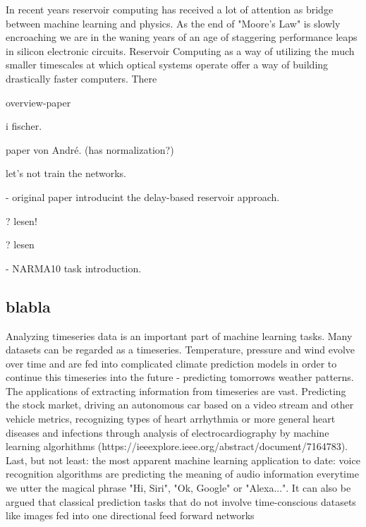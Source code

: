 	In recent years reservoir computing has received a lot of attention as bridge between machine learning and physics. As the end of "Moore's Law" is slowly encroaching we are in the waning years of an age of staggering performance leaps in silicon electronic circuits. Reservoir Computing as a way of utilizing the much smaller timescales at which optical systems operate offer a way of building drastically faster computers. There
	
	\cite{SAN17a} overview-paper

	\cite{LAR12} i fischer.
	
	\cite{ROE18a} paper von André. (has normalization?)
	
	\cite{JAE01} let's not train the networks.
	
	\cite{APP11} - original paper introducint the delay-based reservoir approach.
	
	\cite{ANT19} ? lesen!
	
	\cite{STE20} ? lesen
	
	\cite{ATI00} - NARMA10 task introduction.
	

\subsection{blabla}

Analyzing timeseries data is an important part of machine learning tasks. Many datasets can be regarded as a timeseries. Temperature, pressure and wind evolve over time and are fed into complicated climate prediction models in order to continue this timeseries into the future - predicting tomorrows weather patterns. The applications of extracting information from timeseries are vast. Predicting the stock market, driving an autonomous car based on a video stream and other vehicle metrics, recognizing types of heart arrhythmia or more general heart diseases and infections through analysis of electrocardiography by machine learning algorhithms (https://ieeexplore.ieee.org/abstract/document/7164783). Last, but not least: the most apparent machine learning application to date: voice recognition algorithms are predicting the meaning of audio information everytime we utter the magical phrase "Hi, Siri", "Ok, Google" or "Alexa...". 
It can also be argued that classical prediction tasks that do not involve time-conscious datasets like images fed into one directional feed forward networks 
